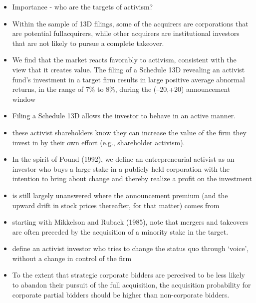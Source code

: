 \documentclass[12pt]{article}
\begin{document}
    \begin{itemize}
        
        \item Importance - who are the targets of activism? \citep{CoffeeJr.2014}
        
        \item Within the sample of 13D filings, some of the acquirers are corporations that are potential fullacquirers, while other acquirers are institutional investors that are not likely to pursue a complete takeover. \citep{Brigida2012}

        \item We find that the market reacts favorably to activism, consistent with the view that it creates value. The filing of a Schedule 13D revealing an activist fund’s investment in a target firm results in large positive average abnormal returns, in the range of 7\% to 8\%, during the (–20,+20) announcement window \citep{Brav2008}

        \item Filing a Schedule 13D allows the investor to behave in an active manner. \citep{Brigida2012}

        \item these activist shareholders know they can increase the value of the firm they invest in by their own effort (e.g., shareholder activism).\citep{Collin-Dufresne2015}

        \item In the spirit of Pound (1992), we define an entrepreneurial activist as an investor who buys a large stake in a publicly held corporation with the intention to bring about change and thereby realize a profit on the investment \citep{Klein2009}

        \item is still largely unanswered where the announcement premium (and the upward drift in stock prices thereafter, for that matter) comes from \citep{Greenwood2009}

        \item starting with Mikkelson and Ruback (1985), note that mergers and takeovers are often preceded by the acquisition of a minority stake in the target. \citep{Greenwood2009}

        \item define an activist investor who tries to change the status quo through ‘voice’, without a change in control of the firm \citep{Greenwood2009}

        \item To the extent that strategic corporate bidders are perceived to be less likely to abandon their pursuit of the full acquisition, the acquisition probability for corporate partial bidders should be higher than non-corporate bidders.

    \end{itemize}
\end{document}
